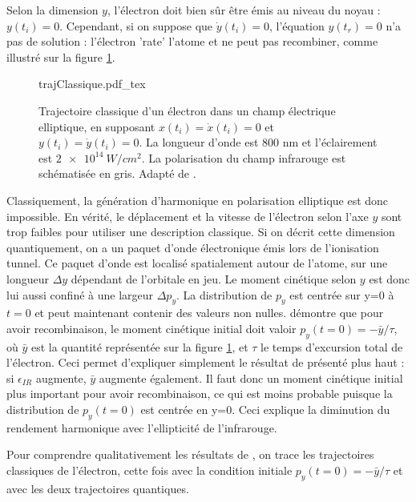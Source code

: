 Selon la dimension $y$, l'électron doit bien sûr être émis au niveau du noyau : $y(t_i) = 0$. Cependant, si on suppose que $\dot{y}(t_i) = 0$, l'équation $y(t_r) = 0$ n'a pas de solution : l'électron 'rate' l'atome et ne peut pas recombiner, comme illustré sur la figure \ref{fig:ellgruson}.

\begin{figure}[!ht]
\centering
\def\svgwidth{0.7\columnwidth}
{trajClassique.pdf_tex}
\caption{Trajectoire classique d'un électron dans un champ électrique elliptique, en supposant $x(t_i) = \dot{x}(t_i) = 0$ et $y(t_i) = \dot{y}(t_i) = 0$. La longueur d'onde est 800 nm et l'éclairement est $\SI{2e14}{W/cm^2}$. La polarisation du champ infrarouge est schématisée en gris. Adapté de .}
\label{fig:ellgruson}
\end{figure}

Classiquement, la génération d'harmonique en polarisation elliptique est donc impossible. En vérité, le déplacement et la vitesse de l'électron selon l'axe $y$ sont trop faibles pour utiliser une description classique. Si on décrit cette dimension quantiquement, on a un paquet d'onde électronique émis lors de l'ionisation tunnel. Ce paquet d'onde est localisé spatialement autour de l'atome, sur une longueur $\Delta y$ dépendant de l'orbitale en jeu. Le moment cinétique selon $y$ est donc lui aussi confiné à une largeur $\Delta p_y$. La distribution de $p_y$ est centrée sur y=0 à $t=0$ et peut maintenant contenir des valeurs non nulles.  démontre que pour avoir recombinaison, le moment cinétique initial doit valoir $p_y(t=0) = -\bar{y}/\tau$, où $\bar{y}$ est la quantité représentée sur la figure \ref{fig:ellgruson}, et $\tau$ le temps d'excursion total de l'électron. Ceci permet d'expliquer simplement le résultat de  présenté plus haut : si $\epsilon_{IR}$ augmente, $\bar{y}$ augmente également. Il faut donc un moment cinétique initial plus important pour avoir recombinaison, ce qui est moins probable puisque la distribution de $p_y(t=0)$ est centrée en y=0. Ceci explique la diminution du rendement harmonique avec l'ellipticité de l'infrarouge.

Pour comprendre qualitativement les résultats de , on trace les trajectoires classiques de l'électron, cette fois avec la condition initiale $p_y(t=0) = -\bar{y}/\tau$ et avec les deux trajectoires quantiques.

